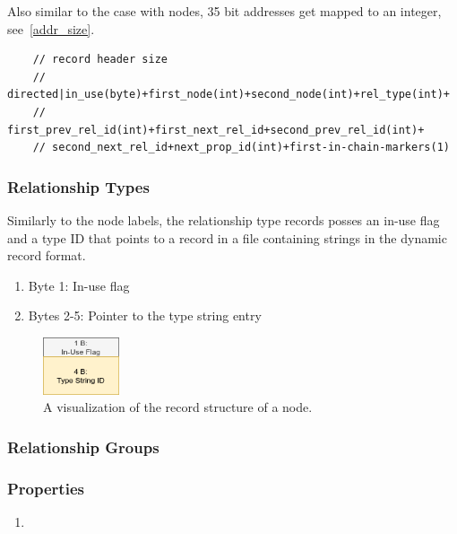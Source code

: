 \documentclass[a4paper,10pt]{article}
\begin{document}
    Also similar to the case with nodes, 35 bit addresses get mapped to an integer, see~\ref{addr_size}.
    \begin{verbatim}
    // record header size
    // directed|in_use(byte)+first_node(int)+second_node(int)+rel_type(int)+
    // first_prev_rel_id(int)+first_next_rel_id+second_prev_rel_id(int)+
    // second_next_rel_id+next_prop_id(int)+first-in-chain-markers(1)
    \end{verbatim}
    
    \subsubsection{Relationship Types}
    Similarly to the node labels, the relationship type records posses an in-use flag and a type ID that points to a record in a file containing strings in the dynamic record format.
        \begin{enumerate}
     \item Byte 1: In-use flag
     \item Bytes 2-5: Pointer to the type string entry
    \end{enumerate}
    
    \begin{figure}[htp]\label{rel_type_record}
        \begin{center}
            \includegraphics[keepaspectratio,height=0.2\textheight,width=0.2\textwidth]{img/rel_type_record.png}
        \end{center}
        \caption{A visualization of the record structure of a node.} %
    \end{figure}
    
    \subsubsection{Relationship Groups}
    

    \subsubsection{Properties}
    \begin{enumerate}
     \item 
    \end{enumerate}
    
\end{document}
